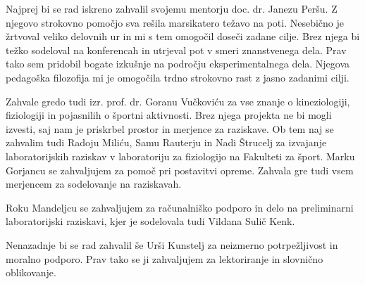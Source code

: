 \zahvalap
Najprej bi se rad iskreno zahvalil svojemu mentorju doc. dr. Janezu Peršu. Z njegovo strokovno pomočjo sva rešila marsikatero težavo na poti. Nesebično je žrtvoval veliko delovnih ur in mi s tem omogočil doseči zadane cilje. Brez njega bi težko sodeloval na konferencah in utrjeval pot v smeri znanstvenega dela. Prav tako sem pridobil bogate izkušnje na področju eksperimentalnega dela. Njegova pedagoška filozofija mi je omogočila trdno strokovno rast z jasno zadanimi cilji.

Zahvale gredo tudi izr. prof. dr. Goranu Vučkoviću za vse znanje o kineziologiji, fiziologiji in pojasnilih o športni aktivnosti. Brez njega projekta ne bi mogli izvesti, saj nam je priskrbel prostor in merjence za raziskave. Ob tem naj se zahvalim tudi Radoju Miliću, Samu Rauterju in Nadi Štrucelj za izvajanje laboratorijskih raziskav v laboratoriju za fiziologijo na Fakulteti za šport. Marku Gorjancu se zahvaljujem za pomoč pri postavitvi opreme. Zahvala gre tudi vsem merjencem za sodelovanje na raziskavah. 

Roku Mandeljcu se zahvaljujem za računalniško podporo in delo na preliminarni laboratorijski raziskavi, kjer je sodelovala tudi Vildana Sulič Kenk.

Nenazadnje bi se rad zahvalil še Urši Kunstelj za neizmerno potrpežljivost in moralno podporo. Prav tako se ji zahvaljujem za lektoriranje in slovnično oblikovanje.